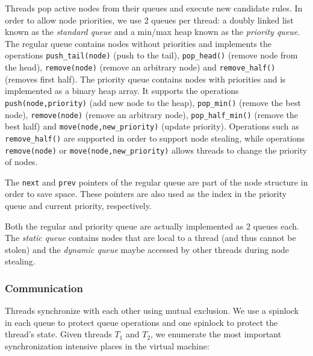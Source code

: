 Threads pop active nodes from their queues and execute new candidate rules. 
In order to allow node priorities, we use 2 queues per thread: a doubly linked
list known as the \emph{standard
queue} and a min/max heap known as the \emph{priority queue}. The regular queue
contains nodes without priorities and
implements the operations \texttt{push\_tail(node)} (push to the tail),
\texttt{pop\_head()} (remove node from the head),
\texttt{remove(node)} (remove an arbitrary node) and \texttt{remove\_half()}
(removes first half). The priority queue contains nodes
with priorities and is implemented as a binary heap array. It supports the
operations \texttt{push(node,priority)} (add new node to the heap),
           \texttt{pop\_min()} (remove the best node),
\texttt{remove(node)} (remove an arbitrary node), \texttt{pop\_half\_min()}
(remove the best half) and \texttt{move(node,new\_priority)} (update priority).
Operations such as \texttt{remove\_half()} are supported in order to support
node stealing, while operations \texttt{remove(node)} or
\texttt{move(node,new\_priority)} allows threads to change the priority of
nodes.

The \texttt{next} and \texttt{prev} pointers of the regular queue are part of
the node structure in order to save space. These pointers are also used as the
index in the priority queue and current priority, respectively.

Both the regular and priority queue are actually implemented as 2 queues each.
The \emph{static queue} contains nodes that are local to a thread (and thus cannot be stolen) and
the \emph{dynamic queue} maybe accessed by other threads during node stealing.

\subsubsection{Communication}

Threads synchronize with each other using mutual exclusion. We use a spinlock in
each queue to protect queue operations and one spinlock to protect the thread's
state. Given threads $T_1$ and $T_2$, we enumerate the most important
synchronization intensive places in the virtual machine:

